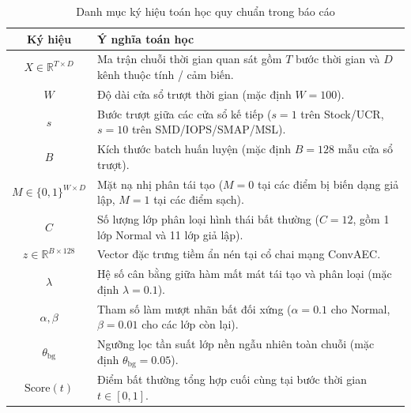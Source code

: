 \documentclass[11pt,journal,onecolumn]{IEEEtran}
\begin{document}
\vspace{0.8cm}

\begin{table}[htbp]
\centering
\caption{Danh mục ký hiệu toán học quy chuẩn trong báo cáo}
\label{tab:notations}
\begin{tabular}{cp{12.0cm}}
\toprule
\textbf{Ký hiệu} & \textbf{Ý nghĩa toán học} \\
\midrule
$X \in \mathbb{R}^{T \times D}$ & Ma trận chuỗi thời gian quan sát gồm $T$ bước thời gian và $D$ kênh thuộc tính / cảm biến. \\
$W$ & Độ dài cửa sổ trượt thời gian (mặc định $W = 100$). \\
$s$ & Bước trượt giữa các cửa sổ kế tiếp ($s=1$ trên Stock/UCR, $s=10$ trên SMD/IOPS/SMAP/MSL). \\
$B$ & Kích thước batch huấn luyện (mặc định $B = 128$ mẫu cửa sổ trượt). \\
$M \in \{0, 1\}^{W \times D}$ & Mặt nạ nhị phân tái tạo ($M=0$ tại các điểm bị biến dạng giả lập, $M=1$ tại các điểm sạch). \\
$C$ & Số lượng lớp phân loại hình thái bất thường ($C = 12$, gồm 1 lớp Normal và 11 lớp giả lập). \\
$z \in \mathbb{R}^{B \times 128}$ & Vector đặc trưng tiềm ẩn nén tại cổ chai mạng ConvAEC. \\
$\lambda$ & Hệ số cân bằng giữa hàm mất mát tái tạo và phân loại (mặc định $\lambda = 0.1$). \\
$\alpha, \beta$ & Tham số làm mượt nhãn bất đối xứng ($\alpha = 0.1$ cho Normal, $\beta = 0.01$ cho các lớp còn lại). \\
$\theta_{\text{bg}}$ & Ngưỡng lọc tần suất lớp nền ngẫu nhiên toàn chuỗi (mặc định $\theta_{\text{bg}} = 0.05$). \\
$\text{Score}(t)$ & Điểm bất thường tổng hợp cuối cùng tại bước thời gian $t \in [0, 1]$. \\
\bottomrule
\end{tabular}
\end{table}

\newpage
\tableofcontents
\newpage
\listoftables
\newpage
\listoffigures
\newpage







\end{document}
